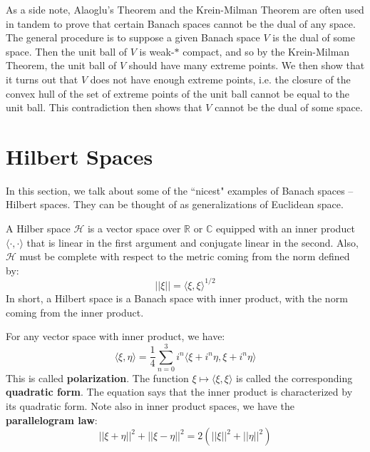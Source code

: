 \documentclass[a4paper,12pt]{report}
\newcommand{\ms}[1]{\mathscr{#1}}
\newenvironment{definition}[1][Definition.]{\begin{trivlist}
\item[\hskip \labelsep {\bfseries #1}]}{\end{trivlist}}
\newenvironment{remark}[1][Remark.]{\begin{trivlist}
\item[\hskip \labelsep {\bfseries #1}]}{\end{trivlist}}
\begin{document}
	\begin{remark}
	As a side note, Alaoglu's Theorem and the Krein-Milman Theorem are often used in tandem to prove that certain Banach spaces cannot be the dual of any space. The general procedure is to suppose a given Banach space $V$ is the dual of some space. Then the unit ball of $V$ is weak-$\ast$ compact, and so by the Krein-Milman Theorem, the unit ball of $V$ should have many extreme points. We then show that it turns out that $V$ does not have enough extreme points, i.e. the closure of the convex hull of the set of extreme points of the unit ball cannot be equal to the unit ball. This contradiction then shows that $V$ cannot be the dual of some space.
	\end{remark}
	
	\section{Hilbert Spaces}
	
	In this section, we talk about some of the ``nicest" examples of Banach spaces -- Hilbert spaces. They can be thought of as generalizations of Euclidean space.
	
	\begin{definition}
	A Hilber space $\ms{H}$ is a vector space over $\mathbb{R}$ or $\mathbb{C}$ equipped with an inner product $\langle \cdot , \cdot \rangle$ that is linear in the first argument and conjugate linear in the second. Also, $\ms{H}$ must be complete with respect to the metric coming from the norm defined by:
	\[ ||\xi|| = \langle \xi, \xi \rangle^{1/2} \]
	In short, a Hilbert space is a Banach space with inner product, with the norm coming from the inner product.
	\end{definition}
	
	\begin{remark}
	For any vector space with inner product, we have:
	\[ \langle \xi, \eta \rangle = \frac{1}{4} \sum_{n=0}^3 i^n \langle \xi + i^n \eta, \xi + i^n \eta \rangle \]
	This is called \textbf{polarization}. The function $\xi \mapsto \langle \xi, \xi \rangle$ is called the corresponding \textbf{quadratic form}. The equation says that the inner product is characterized by its quadratic form. Note also in inner product spaces, we have the \textbf{parallelogram law}:
	\[ ||\xi + \eta||^2 + ||\xi - \eta||^2 = 2(||\xi||^2 + ||\eta||^2) \]
	\end{remark}
	
\end{document}
